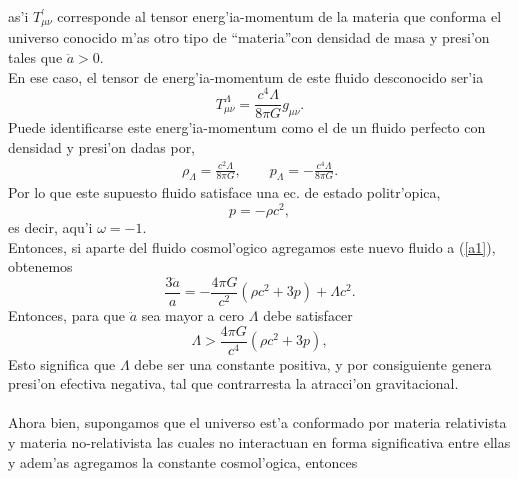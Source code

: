 as'i $T^{\prime}_{\mu \nu}$ corresponde al tensor energ'ia-momentum de la materia que conforma el universo conocido m'as 
otro tipo de \textquotedblleft materia\textquotedblright  con densidad de masa y presi'on tales que $\ddot a > 0$.\\
En ese caso, el tensor de energ'ia-momentum de este fluido desconocido ser'ia
\begin{equation}
T^{\Lambda}_{\mu\nu}=\frac{c^4\Lambda}{8\pi G} g_{\mu\nu}.
\end{equation}
Puede identificarse este energ'ia-momentum como el de un fluido perfecto con densidad y presi'on dadas por,
\begin{eqnarray}
\rho_{\Lambda}=\frac{c^2\Lambda}{8\pi G},    \qquad
p_{\Lambda}=-\frac{c^4\Lambda}{8\pi G}.
\end{eqnarray}
Por lo que este supuesto fluido satisface una ec. de estado politr'opica,
\begin{equation}
p=-\rho c^2,
\end{equation}
es decir, aqu'i  $\omega=-1$.\\
Entonces, si aparte del fluido cosmol'ogico agregamos este nuevo fluido a (\ref{a1}), obtenemos
\begin{equation}
\frac{3\ddot a}{a}=-\frac{4\pi G}{c^2}(\rho c^2+3p)+\Lambda c^2. 
\end{equation}
Entonces, para que $\ddot a$ sea mayor a cero $\Lambda$ debe satisfacer
\begin{equation}
\Lambda > \frac{4\pi G}{c^4}(\rho c^2 + 3p),
\end{equation}
Esto significa que $\Lambda$ debe ser una constante positiva, y por consiguiente genera presi'on efectiva negativa, tal que
contrarresta la atracci'on gravitacional.\\ \\
Ahora bien, supongamos que el universo est'a conformado por materia relativista y materia no-relativista las cuales no interactuan en forma significativa entre ellas  y adem'as agregamos la constante cosmol'ogica, entonces

